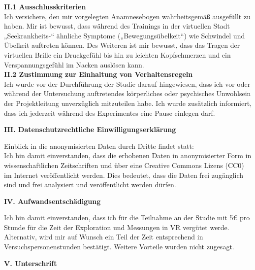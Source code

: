 \textbf{II.1 Ausschlusskriterien} \\

Ich versichere, den mir vorgelegten Anamnesebogen wahrheitsgemäß ausgefüllt zu haben. Mir ist bewusst, dass während des Trainings in der virtuellen Stadt „Seekrankheits-“ ähnliche Symptome („Bewegungsübelkeit“) wie Schwindel und Übelkeit auftreten können. Des Weiteren ist mir bewusst, dass das Tragen der virtuellen Brille ein Druckgefühl bis hin zu leichten Kopfschmerzen und ein Verspannungsgefühl im Nacken auslösen kann.  \\

\textbf{II.2 Zustimmung zur Einhaltung von Verhaltensregeln} \\

Ich wurde vor der Durchführung der Studie darauf hingewiesen, dass ich vor oder während der Untersuchung auftretendes körperliches oder psychisches Unwohlsein der Projektleitung unverzüglich mitzuteilen habe. Ich wurde zusätzlich informiert, dass ich jederzeit während des Experimentes eine Pause einlegen darf. \\

\begin{center}
	\large{\textbf{III. Datenschutzrechtliche Einwilligungserklärung}} \\
\end{center}


Einblick in die anonymisierten Daten durch Dritte findet statt: \\

Ich bin damit einverstanden, dass die erhobenen Daten in anonymisierter Form in wissenschaftlichen Zeitschriften und über eine Creative Commons Lizens (CC0) im Internet veröffentlicht werden. Dies bedeutet, dass die Daten frei zugänglich sind und frei analysiert und veröffentlicht werden dürfen. \\

\begin{center}
	\large{\textbf{IV. Aufwandsentschädigung}} \\
\end{center}


Ich bin damit einverstanden, dass ich für die Teilnahme an der Studie mit  5€ pro Stunde für die Zeit der Exploration und Messungen in VR vergütet werde. Alternativ, wird mir auf Wunsch ein Teil der Zeit entsprechend in Versuchspersonenstunden bestätigt. Weitere Vorteile wurden nicht zugesagt. \\

\begin{center}
	\large{\textbf{V. Unterschrift}} \\
\end{center}


